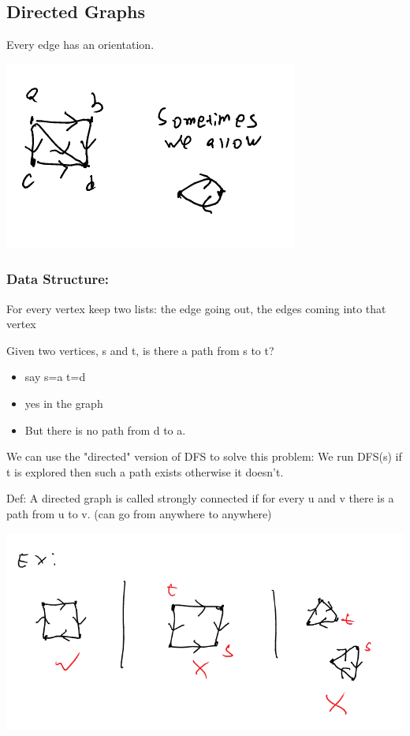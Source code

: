 \documentclass[11pt]{article}
\begin{document}
\subsection{Directed Graphs}
\label{sec:org4170c43}
Every edge has an orientation.
\begin{center}
\includegraphics[width=.9\linewidth]{./Images/i21.png}
\end{center}

\subsubsection{Data Structure:}
\label{sec:org8bb9e9d}
For every vertex keep two lists: the edge going out, the edges coming into that vertex

Given two vertices, s and t, is there a path from s to t?
\begin{itemize}
\item say s=a t=d
\item yes in the graph
\item But there is no path from d to a.
\end{itemize}
We can use the "directed" version of DFS to solve this problem: We run DFS(s) if t is explored then such a path exists otherwise it doesn't.

Def: A directed graph is called strongly connected if for every u and v there is a path from u to v. (can go from anywhere to anywhere)

\begin{center}
\includegraphics[width=.9\linewidth]{./Images/i22.png}
\end{center}
\end{document}
